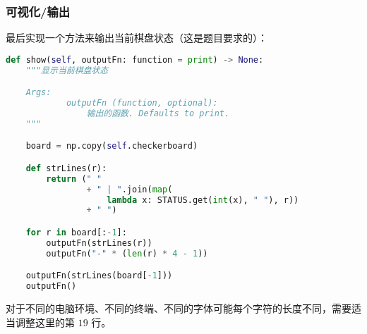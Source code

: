 \subsubsection{可视化/输出}
最后实现一个方法来输出当前棋盘状态（这是题目要求的）：
\begin{lstlisting}[language=python]
def show(self, outputFn: function = print) -> None:
    """显示当前棋盘状态

    Args:
            outputFn (function, optional):
                输出的函数. Defaults to print.
    """

    board = np.copy(self.checkerboard)

    def strLines(r):
        return (" "
                + " | ".join(map(
                    lambda x: STATUS.get(int(x), " "), r))
                + " ")

    for r in board[:-1]:
        outputFn(strLines(r))
        outputFn("-" * (len(r) * 4 - 1))

    outputFn(strLines(board[-1]))
    outputFn()
\end{lstlisting}
对于不同的电脑环境、不同的终端、不同的字体可能每个字符的长度不同，需要适当调整这里的第 $19$ 行。